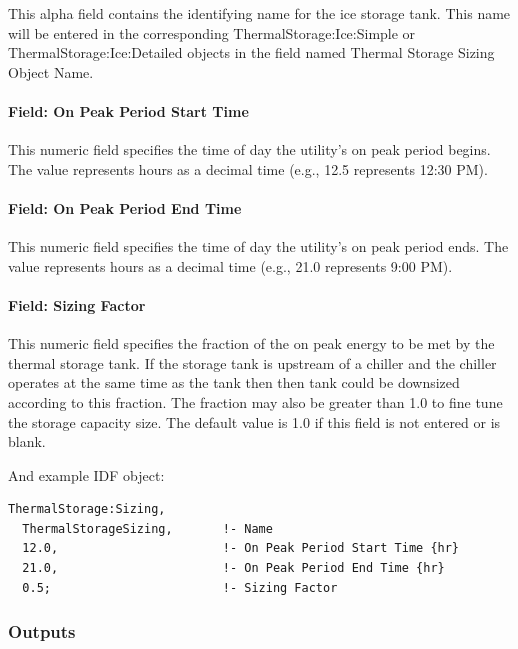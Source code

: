 This alpha field contains the identifying name for the ice storage tank. This name will be entered in the corresponding ThermalStorage:Ice:Simple or ThermalStorage:Ice:Detailed objects in the field named Thermal Storage Sizing Object Name.

\paragraph{Field: On Peak Period Start Time}\label{field-on-peak-period-start-time}

This numeric field specifies the time of day the utility's on peak period begins. The value represents hours as a decimal time (e.g., 12.5 represents 12:30 PM).

\paragraph{Field: On Peak Period End Time}\label{field-on-peak-period-end-time}

This numeric field specifies the time of day the utility's on peak period ends. The value represents hours as a decimal time (e.g., 21.0 represents 9:00 PM).

\paragraph{Field: Sizing Factor}\label{field-sizing-factor-20-105}

This numeric field specifies the fraction of the on peak energy to be met by the thermal storage tank. If the storage tank is upstream of a chiller and the chiller operates at the same time as the tank then then tank could be downsized according to this fraction. The fraction may also be greater than 1.0 to fine tune the storage capacity size. The default value is 1.0 if this field is not entered or is blank.

And example IDF object:

\begin{lstlisting}
ThermalStorage:Sizing,
  ThermalStorageSizing,       !- Name
  12.0,                       !- On Peak Period Start Time {hr}
  21.0,                       !- On Peak Period End Time {hr}
  0.5;                        !- Sizing Factor
\end{lstlisting}

\subsubsection{Outputs}\label{outputs-pcmstorage}

